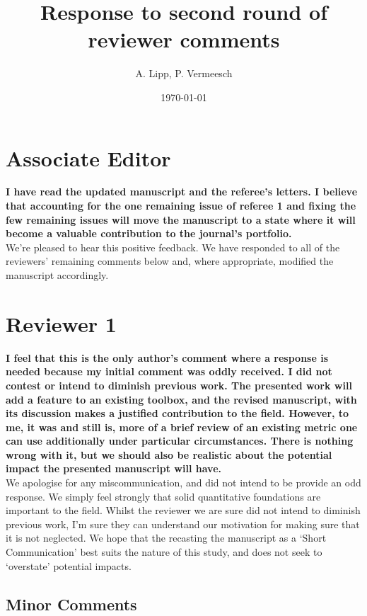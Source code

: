 \documentclass{article}[12p,a4paper]
\author{A. Lipp, P. Vermeesch}
\date{\today}
\title{Response to second round of reviewer comments}
\begin{document}
\maketitle

\section*{Associate Editor} 

\textbf{I have read the updated manuscript and the referee's letters. I believe that accounting for the one remaining issue of referee 1 and fixing the few remaining issues will move the manuscript to a state where it will become a valuable contribution to the journal's portfolio.}\\

We're pleased to hear this positive feedback. We have responded to all of the reviewers' remaining comments below and, where appropriate, modified the manuscript accordingly. 

\section*{Reviewer 1}

\textbf{I feel that this is the only author’s comment where a response is needed because my initial comment was oddly received. I did not contest or intend to diminish previous work. The presented work will add a feature to an existing toolbox, and the revised manuscript, with its discussion makes a justified contribution to the field. However, to me, it was and still is, more of a brief review of an existing metric one can use additionally under particular circumstances. There is nothing wrong with it, but we should also be realistic about the potential impact the presented manuscript will have.}\\

We apologise for any miscommunication, and did not intend to be provide an odd response. We simply feel strongly that solid quantitative foundations are important to the field. Whilst the reviewer we are sure did not intend to diminish previous work, I'm sure they can understand our motivation for making sure that it is not neglected. We hope that the recasting the manuscript as a `Short Communication' best suits the nature of this study, and  does not seek to `overstate' potential impacts.\\

\subsection*{Minor Comments}
\end{document}
